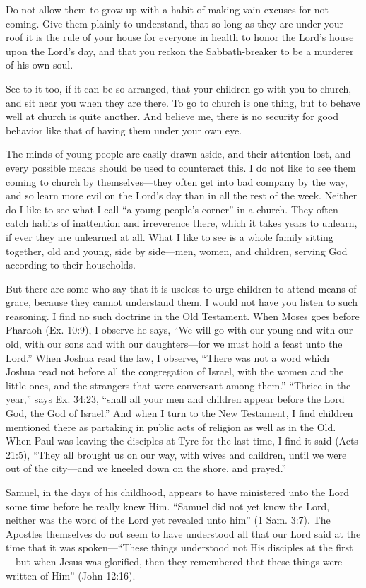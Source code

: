 \documentclass[
]{book}
\begin{document}
Do not allow them to grow up with a habit of making vain excuses for not coming. Give them plainly to understand, that so long as they are under your roof it is the rule of your house for everyone in health to honor the Lord's house upon the Lord's day, and that you reckon the Sabbath-breaker to be a murderer of his own soul.

See to it too, if it can be so arranged, that your children go with you to church, and sit near you when they are there. To go to church is one thing, but to behave well at church is quite another. And believe me, there is no security for good behavior like that of having them under your own eye.

The minds of young people are easily drawn aside, and their attention lost, and every possible means should be used to counteract this. I do not like to see them coming to church by themselves---they often get into bad company by the way, and so learn more evil on the Lord's day than in all the rest of the week. Neither do I like to see what I call ``a young people's corner'' in a church. They often catch habits of inattention and irreverence there, which it takes years to unlearn, if ever they are unlearned at all. What I like to see is a whole family sitting together, old and young, side by side---men, women, and children, serving God according to their households.

But there are some who say that it is useless to urge children to attend means of grace, because they cannot understand them. I would not have you listen to such reasoning. I find no such doctrine in the Old Testament. When Moses goes before Pharaoh (Ex. 10:9), I observe he says, ``We will go with our young and with our old, with our sons and with our daughters---for we must hold a feast unto the Lord.'' When Joshua read the law, I observe, ``There was not a word which Joshua read not before all the congregation of Israel, with the women and the little ones, and the strangers that were conversant among them.'' ``Thrice in the year,'' says Ex. 34:23, ``shall all your men and children appear before the Lord God, the God of Israel.'' And when I turn to the New Testament, I find children mentioned there as partaking in public acts of religion as well as in the Old. When Paul was leaving the disciples at Tyre for the last time, I find it said (Acts 21:5), ``They all brought us on our way, with wives and children, until we were out of the city---and we kneeled down on the shore, and prayed.''

Samuel, in the days of his childhood, appears to have ministered unto the Lord some time before he really knew Him. ``Samuel did not yet know the Lord, neither was the word of the Lord yet revealed unto him'' (1 Sam. 3:7). The Apostles themselves do not seem to have understood all that our Lord said at the time that it was spoken---``These things understood not His disciples at the first---but when Jesus was glorified, then they remembered that these things were written of Him'' (John 12:16).
\end{document}
